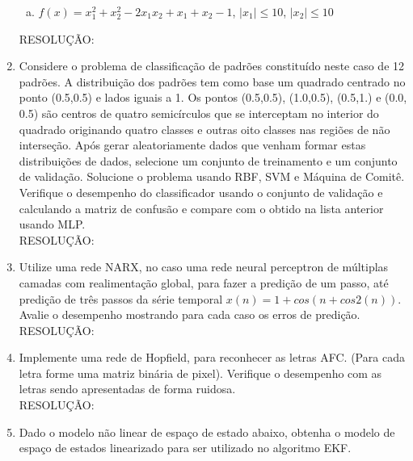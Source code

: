 \documentclass[a4paper,oneside,12pt]{article}
\begin{document}
\begin{enumerate}[1.]
\begin{enumerate}[a)]
\item $f(x) = x_{1}^{2} + x_{2}^{2} - 2 x_{1} x_{2} + x_{1} + x_{2} - 1$, $|x_{1}| \leq 10$, $|x_{2}| \leq 10$
\end{enumerate}

RESOLU\c{C}\~AO: \\

\item Considere o problema de classifica\c{c}\~ao de padr\~oes constitu\'ido neste caso de 12 padr\~oes. A distribui\c{c}\~ao dos padr\~oes tem como base um quadrado centrado no ponto (0.5,0.5) e lados iguais a 1. Os pontos (0.5,0.5), (1.0,0.5), (0.5,1.) e (0.0, 0.5) s\~ao centros de quatro semic\'irculos que se interceptam no interior do quadrado originando quatro classes e outras oito classes nas regi\~oes de n\~ao interse\c{c}\~ao. Ap\'os gerar aleatoriamente dados que venham formar estas distribui\c{c}\~oes de dados, selecione um conjunto de treinamento e um conjunto de valida\c{c}\~ao. Solucione o problema usando RBF, SVM e M\'aquina de Comit\^e. Verifique o desempenho do classificador usando o conjunto de valida\c{c}\~ao e calculando a matriz de confus\~ao e compare com o obtido na lista anterior usando MLP. \\

RESOLU\c{C}\~AO: \\

\item Utilize uma rede NARX, no caso uma rede neural perceptron de m\'ultiplas camadas com realimenta\c{c}\~ao global, para fazer a predi\c{c}\~ao de um passo, at\'e predi\c{c}\~ao de tr\^es passos da s\'erie temporal $x(n) = 1 + cos(n + cos 2 (n))$. Avalie o desempenho mostrando para cada caso os erros de predi\c{c}\~ao. \\

RESOLU\c{C}\~AO: \\

\item Implemente uma rede de Hopfield, para reconhecer as letras AFC. (Para cada letra forme uma matriz bin\'aria de pixel). Verifique o desempenho com as letras sendo apresentadas de forma ruidosa. \\

RESOLU\c{C}\~AO: \\

\item Dado o modelo n\~ao linear de espa\c{c}o de estado abaixo, obtenha o modelo de espa\c{c}o de estados linearizado para ser utilizado no algoritmo EKF. \\


\end{enumerate}
\end{document}
